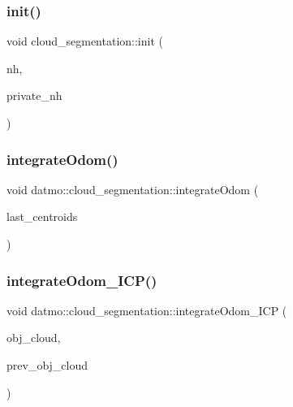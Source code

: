 \mbox{\label{classdatmo_1_1cloud__segmentation_a9ad8d99df49f5b55a920d477c4dcc0ef}} 
\subsubsection{\texorpdfstring{init()}{init()}}
{\footnotesize\ttfamily void cloud\+\_\+segmentation\+::init (\begin{DoxyParamCaption}\item[{ros\+::\+Node\+Handle \&}]{nh,  }\item[{ros\+::\+Node\+Handle \&}]{private\+\_\+nh }\end{DoxyParamCaption})}

\mbox{\label{classdatmo_1_1cloud__segmentation_a40bcbb38bad5059c86e845e84ac113d0}} 
\subsubsection{\texorpdfstring{integrate\+Odom()}{integrateOdom()}}
{\footnotesize\ttfamily void datmo\+::cloud\+\_\+segmentation\+::integrate\+Odom (\begin{DoxyParamCaption}\item[{pcl\+::\+Point\+Cloud$<$ pcl\+::\+Point\+X\+YZ $>$ \&}]{last\+\_\+centroids }\end{DoxyParamCaption})\hspace{0.3cm}{\ttfamily [private]}}

\mbox{\label{classdatmo_1_1cloud__segmentation_a44ccd6481ff32f6325121df0873a5d0d}} 
\subsubsection{\texorpdfstring{integrate\+Odom\+\_\+\+I\+C\+P()}{integrateOdom\_ICP()}}
{\footnotesize\ttfamily void datmo\+::cloud\+\_\+segmentation\+::integrate\+Odom\+\_\+\+I\+CP (\begin{DoxyParamCaption}\item[{const pcl\+::\+Point\+Cloud$<$ pcl\+::\+Point\+X\+YZ $>$\+::Const\+Ptr \&}]{obj\+\_\+cloud,  }\item[{const pcl\+::\+Point\+Cloud$<$ pcl\+::\+Point\+X\+YZ $>$\+::Ptr \&}]{prev\+\_\+obj\+\_\+cloud }\end{DoxyParamCaption})\hspace{0.3cm}{\ttfamily [private]}}

